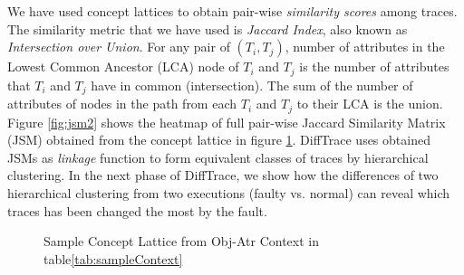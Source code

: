 We have used concept lattices to obtain pair-wise \textit{similarity scores} among traces. The similarity metric that we have used is \textit{Jaccard Index}, also known as \textit{Intersection over Union}. For any pair of $(T_i,T_j)$, number of attributes in the Lowest Common Ancestor (LCA) node of $T_i$ and $T_j$ is the number of attributes that $T_i$ and $T_j$ have in common (intersection). The sum of the number of attributes of nodes in the path from each $T_i$ and $T_j$ to their LCA is the union. 
%
Figure \ref{fig:jsm2} shows the heatmap of full pair-wise Jaccard Similarity Matrix (JSM) obtained from the concept lattice in figure \ref{fig:sampleCL}.
%
DiffTrace uses obtained JSMs as \textit{linkage} function to form equivalent classes of traces by hierarchical clustering.
%
In the next phase of DiffTrace, we show how the differences of two hierarchical clustering from two executions (faulty vs. normal) can reveal which traces has been changed the most by the fault.






\begin{figure}[t]
\centering
{}
\caption{Sample Concept Lattice from Obj-Atr Context in table\ref{tab:sampleContext}}
\label{fig:sampleCL}
\end{figure}




